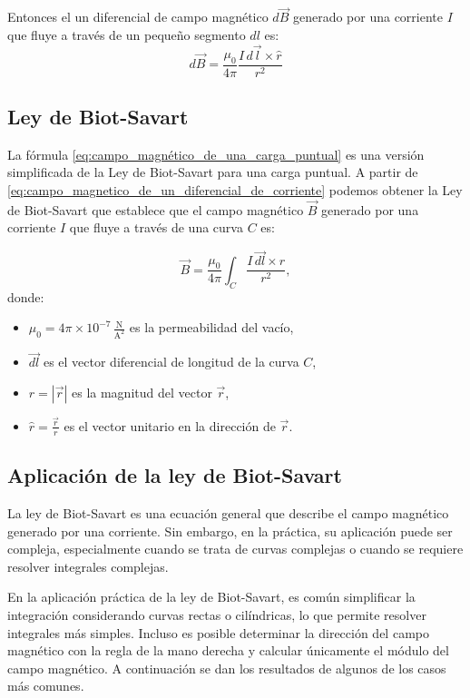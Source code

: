 Entonces el un diferencial de campo magnético \(d\vec{B}\) generado por una corriente \(I\) que fluye a través de un pequeño segmento \(dl\) es:
\begin{equation}
  \boxed{d\vec{B} = \frac{\mu_0}{4\pi} \frac{I \, d\vec{l} \times \hat{r}}{r^2}}
  \label{eq:campo_magnetico_de_un_diferencial_de_corriente}
\end{equation}

\subsection{Ley de Biot-Savart}

La fórmula \ref{eq:campo_magnético_de_una_carga_puntual} es una versión simplificada de la Ley de Biot-Savart para una carga puntual. A partir de \eqref{eq:campo_magnetico_de_un_diferencial_de_corriente} podemos obtener la Ley de Biot-Savart que establece que el campo magnético \(\vec{B}\) generado por una corriente \(I\) que fluye a través de una curva \(C\) es:

\begin{equation}
  \vec{B} = \frac{\mu_0}{4\pi} \int_C \frac{I \, \vec{dl} \times \hat{r}}{r^2},
\end{equation}
donde:
\begin{itemize}
  \item \(\mu_0 = 4 \pi \times 10^{-7} \, \frac{\si{\newton}}{\si{\ampere\squared}}\) es la permeabilidad del vacío,
  \item \(\vec{dl}\) es el vector diferencial de longitud de la curva \(C\),
  \item \(r = |\vec{r}|\) es la magnitud del vector \(\vec{r}\),
  \item \(\hat{r} = \frac{\vec{r}}{r}\) es el vector unitario en la dirección de \(\vec{r}\).
\end{itemize}

\subsection{Aplicación de la ley de Biot-Savart}
\label{sec:aplicacion_de_la_ley_de_biot_savart}

La ley de Biot-Savart es una ecuación general que describe el campo magnético generado por una corriente. Sin embargo, en la práctica, su aplicación puede ser compleja, especialmente cuando se trata de curvas complejas o cuando se requiere resolver integrales complejas.

En la aplicación práctica de la ley de Biot-Savart, es común simplificar la integración considerando curvas rectas o cilíndricas, lo que permite resolver integrales más simples. Incluso es posible determinar la dirección del campo magnético con la regla de la mano derecha y calcular únicamente el módulo del campo magnético. A continuación se dan los resultados de algunos de los casos más comunes.

